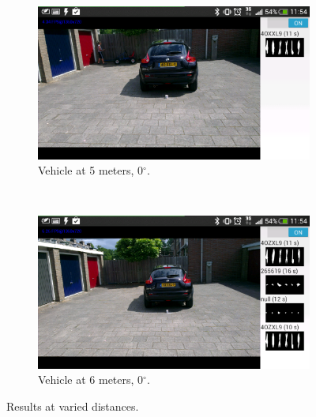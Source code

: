 \begin{figure}[ht]
        \begin{subfigure}{0.5\textwidth}
            \includegraphics[width=\textwidth]{plaatjes/test-5m-0a}
            \caption{Vehicle at 5 meters, 0$^{\circ}$.}
            \label{fig:5m-0a}
        \end{subfigure}%
        ~
        \begin{subfigure}{0.5\textwidth}
            \includegraphics[width=\textwidth]{plaatjes/test-6m-0a}
            \caption{Vehicle at 6 meters, 0$^{\circ}$.}
            \label{fig:6m-0a}
        \end{subfigure}%

        \caption{Results at varied distances.}
        \label{fig:distance-test}
\end{figure} %

